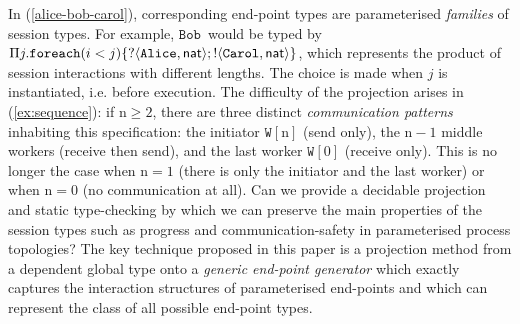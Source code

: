 \documentclass{LMCS}
\newcommand{\kf}[1]{\textup{\textsf{#1}}\xspace}
\newcommand{\Nat}{\kf{nat}}
\newcommand{\ENCan}[1]{\langle #1 \rangle}
\newcommand{\ii}{\ensuremath{i}}
\newcommand{\n}{\ensuremath{\mathrm{n}}}
\newcommand{\Alice}{\ensuremath{\mathtt{Alice}}}
\newcommand{\Bob}{\ensuremath{\mathtt{Bob}}}
\newcommand{\Carol}{\ensuremath{\mathtt{Carol}}}
\newcommand{\W}{\ensuremath{\mathtt{W}}}
\newcommand{\FOREACH}[3]{\ensuremath{\mathtt{foreach}(#1 #2)\{#3\}}}
\begin{document}
In (\ref{alice-bob-carol}), corresponding end-point
types are parameterised {\em families} of session types.
For example,
\Bob \ would be typed by $\Pi
j.\FOREACH{\ii}{<j}{?\ENCan{\Alice,\Nat};!\ENCan{\Carol,\Nat}}$, which
represents the product of session interactions with different lengths. The
choice is made when $j$ is instantiated, i.e. before execution.
The difficulty of the projection
arises in
(\ref{ex:sequence}): if $\n\!\geq\! 2$, there are three
distinct {\em communication patterns} inhabiting this
specification: the initiator $\W[\n]$ (send only), the $\n-1$ middle workers
(receive then send), and the last worker $\W[0]$ (receive only). This is no
longer the case when $\n= 1$ (there is only the initiator and the last
worker) or when $\n= 0$ (no communication at all).  Can we provide a
decidable projection and static type-checking by which we
can preserve the main properties of the session types such as progress
and communication-safety in parameterised process topologies?  The key
technique proposed in this paper is a projection method from a
dependent global type onto a {\em generic end-point generator} which
exactly captures the interaction structures of parameterised end-points
and which can represent the class of all possible end-point
types.
\end{document}
